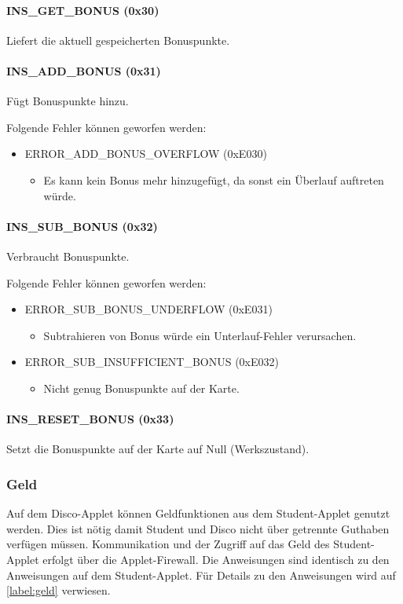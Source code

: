 \paragraph{INS\_GET\_BONUS (0x30)}
Liefert die aktuell gespeicherten Bonuspunkte.
\paragraph{INS\_ADD\_BONUS (0x31)}
Fügt Bonuspunkte hinzu.

Folgende Fehler können geworfen werden:
\begin{itemize}
	\item ERROR\_ADD\_BONUS\_OVERFLOW (0xE030)
	\begin{itemize}
		\item Es kann kein Bonus mehr hinzugefügt, da sonst ein Überlauf auftreten würde.
	\end{itemize}
\end{itemize}
\paragraph{INS\_SUB\_BONUS (0x32)}
Verbraucht Bonuspunkte.

Folgende Fehler können geworfen werden:
\begin{itemize}
	\item ERROR\_SUB\_BONUS\_UNDERFLOW (0xE031)
	\begin{itemize}
		\item Subtrahieren von Bonus würde ein Unterlauf-Fehler verursachen.
	\end{itemize}
	\item ERROR\_SUB\_INSUFFICIENT\_BONUS (0xE032)
	\begin{itemize}
		\item Nicht genug Bonuspunkte auf der Karte.
	\end{itemize}
\end{itemize}
\paragraph{INS\_RESET\_BONUS (0x33)}
Setzt die Bonuspunkte auf der Karte auf Null (Werkszustand).

\subsubsection{Geld}
Auf dem Disco-Applet können Geldfunktionen aus dem Student-Applet genutzt werden.
Dies ist nötig damit Student und Disco nicht über getrennte Guthaben verfügen müssen.
Kommunikation und der Zugriff auf das Geld des Student-Applet erfolgt über die Applet-Firewall.
Die Anweisungen sind identisch zu den Anweisungen auf dem Student-Applet.
Für Details zu den Anweisungen wird auf \autoref{label:geld} verwiesen.

